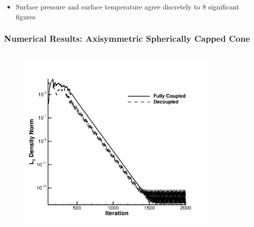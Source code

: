 \documentclass{beamer}
\begin{document}
\begin{frame}
\begin{columns}[t]
\begin{column}{0.5\textwidth}
\begin{figure}[h!]
        \end{figure}
      \end{column}
    \end{columns}
    \begin{itemize}
      \item Surface pressure and surface temperature agree discretely 
	to 8 significant figures
    \end{itemize}
\end{frame}
\begin{frame}
  \frametitle{Numerical Results: Axisymmetric Spherically Capped Cone}
    \begin{columns}[t]
      \begin{column}{0.5\textwidth}
        \begin{figure}[h!]
    	  \includegraphics[width=\textwidth]{figures/cone_iteration}
        \end{figure}
      \end{column}
      \begin{column}{0.5\textwidth}
        \begin{figure}[h!]

\end{figure}
\end{column}
\end{columns}
\end{frame}
\end{document}
